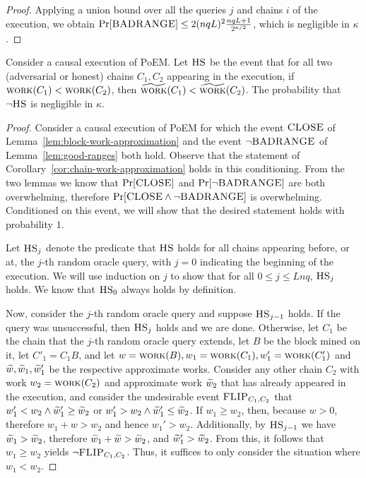 \begin{proof}
  Applying a union bound over all the queries $j$ and chains $i$ of the execution, we obtain
  $\Pr[\textsc{BADRANGE}] \leq 2 (nqL)^2 \frac{nqL + 1}{2^{\kappa/2}}$, which is negligible in $\kappa$.
  \Qed
\end{proof}

\begin{lemma}
  Consider a causal execution of PoEM. Let $\textsc{HS}$ be the event that for
  all two (adversarial or honest) chains
  $C_1, C_2$ appearing in the execution, if
  $\textsc{work}(C_1) < \textsc{work}(C_2)$, then $\widetilde{\textsc{work}}(C_1) < \widetilde{\textsc{work}}(C_2)$.
  The probability that $\lnot \textsc{HS}$ is negligible in $\kappa$.
\end{lemma}
\begin{proof}
  Consider a causal execution of PoEM for which
  the event $\textsc{CLOSE}$ of Lemma~\ref{lem:block-work-approximation}
  and the event $\lnot \textsc{BADRANGE}$ of Lemma~\ref{lem:good-ranges}
  both hold.
  Observe that the statement of Corollary~\ref{cor:chain-work-approximation}
  holds in this conditioning.
  From the two lemmas we know that $\Pr[\textsc{CLOSE}]$ and
  $\Pr[\lnot \textsc{BADRANGE}]$ are both overwhelming, therefore
  $\Pr[\textsc{CLOSE} \land \lnot \textsc{BADRANGE}]$ is overwhelming.
  Conditioned on this event, we will
  show that the desired statement holds with probability $1$.

  Let $\textsc{HS}_j$ denote the predicate that $\textsc{HS}$ holds for all chains appearing
  before, or at, the $j$-th random oracle query, with $j = 0$ indicating
  the beginning of the execution.
  We will use induction on $j$ to show that for all $0 \leq j \leq Lnq$,
  $\textsc{HS}_j$ holds. We know that $\textsc{HS}_0$ always holds by definition.

  Now, consider the $j$-th random oracle query and suppose $\textsc{HS}_{j - 1}$ holds.
  If the query was unsuccessful, then $\textsc{HS}_j$ holds and we are done.
  Otherwise, let $C_1$ be the chain
  that the $j$-th random oracle query extends, let $B$ be the block mined on it,
  let $C'_1 = C_1 B$, and let $w = \textsc{work}(B), w_1 = \textsc{work}(C_1), w'_1 = \textsc{work}(C'_1)$
  and $\widetilde{w}, \widetilde{w}_1, \widetilde{w}'_1$ be the respective approximate works.
  Consider any other chain $C_2$ with work $w_2 = \textsc{work}(C_2)$
  and approximate work $\widetilde{w}_2$
  that has already appeared in the execution,
  and consider the undesirable event $\textsc{FLIP}_{C_1,C_2}$ that
  $w'_1 < w_2 \land \widetilde{w}'_1 \geq \widetilde{w}_2$ or $w'_1 > w_2 \land \widetilde{w}'_1 \leq \widetilde{w}_2$.
  If $w_1 \geq w_2$, then, because $w > 0$, therefore $w_1 + w > w_2$ and hence $w_1' > w_2$.
  Additionally, by $\textsc{HS}_{j - 1}$ we have $\widetilde{w}_1 > \widetilde{w}_2$, therefore $\widetilde{w}_1 + \widetilde{w} > \widetilde{w}_2$, and
  $\widetilde{w}_1' > \widetilde{w}_2$. From this, it follows that $w_1 \geq w_2$ yields $\lnot \textsc{FLIP}_{C_1,C_2}$.
  Thus, it suffices to only consider the situation where $w_1 < w_2$.


\end{proof}
